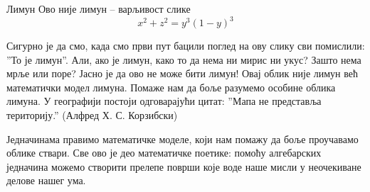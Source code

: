 \begin{surferPage}{Лимун}
Ово није лимун – варљивост слике\\
\smallskip
\[x^2 + z^2 = y^3 (1 - y)^3\] 


\singlespacing
Сигурно је да смо, када смо први пут бацили поглед на ову слику сви помислили: ''То је лимун''. Али, ако је лимун, како то да нема ни мирис ни укус? Зашто нема мрље или поре? Јасно је да ово не може бити лимун! 
\singlespacing
Овај облик није лимун већ математички модел лимуна. Помаже нам да боље разумемо особине облика лимуна. У географији постоји одговарајући цитат: ''Мапа не представља територију.'' (Алфред Х. С. Корзибски) \\
\singlespacing

Једначинама правимо математичке моделе, који нам помажу да боље проучавамо облике ствари. 
\singlespacing
Све ово је део математичке поетике: помоћу алгебарских једначина можемо створити прелепе површи које воде наше мисли у неочекиване делове нашег ума.
\end{surferPage}
